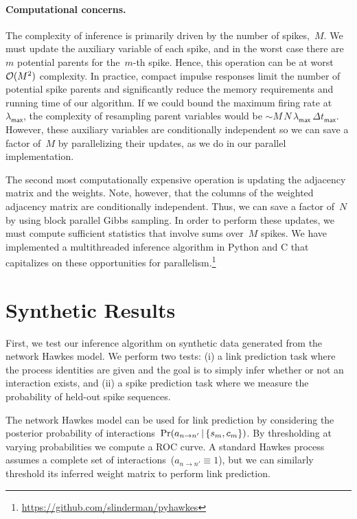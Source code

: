 \paragraph{Computational concerns.}
The complexity of
inference is primarily driven by the number of spikes,~$M$. We must
update the auxiliary variable of each spike, and in the worst case
there are~$m$ potential parents for the~$m$-th spike. Hence, this
operation can be at worst~$\mathcal{O}(M^2)$ complexity.  In practice,
compact impulse responses limit the number of potential spike parents
and significantly reduce the memory requirements and running time of
our algorithm. If we could bound the maximum firing rate at~$\lambda_{\mathsf{max}}$,
the complexity of resampling parent variables would be ${\sim M \, N \, \lambda_{\mathsf{max}} \, \Delta t_{\mathsf{max}}}$. However, these auxiliary
variables are conditionally independent so we can save a factor of~$M$
by parallelizing their updates, as we do in our parallel implementation.

The second most computationally expensive operation is updating the
adjacency matrix and the weights. Note, however, that the columns of
the weighted adjacency matrix are conditionally independent. Thus,
we can save a factor of~$N$ by using block parallel Gibbs sampling.
In order to perform these updates, we must compute sufficient statistics
that involve sums over~$M$ spikes.
We have implemented a multithreaded inference algorithm in Python and
C that capitalizes on these opportunities for
parallelism.\footnote{\url{https://github.com/slinderman/pyhawkes}}


\section{Synthetic Results}
\label{sec:synth}
First, we test our inference algorithm on synthetic data generated
from the network Hawkes model. We perform two tests: (i) a link
prediction task where the process identities are given and the goal is
to simply infer whether or not an interaction exists, and (ii) a spike
prediction task where we measure the probability of held-out spike
sequences.

The network Hawkes model can be used for link prediction by
considering the posterior probability of interactions~$\Pr(a_{n \to
  n'}\,|\, \{s_m,c_m\})$. By thresholding at varying probabilities we
compute a ROC curve. A standard Hawkes process assumes a complete set
of interactions~($a_{n \to n'}\equiv 1$), but we can similarly threshold
its inferred weight matrix to perform link prediction.

